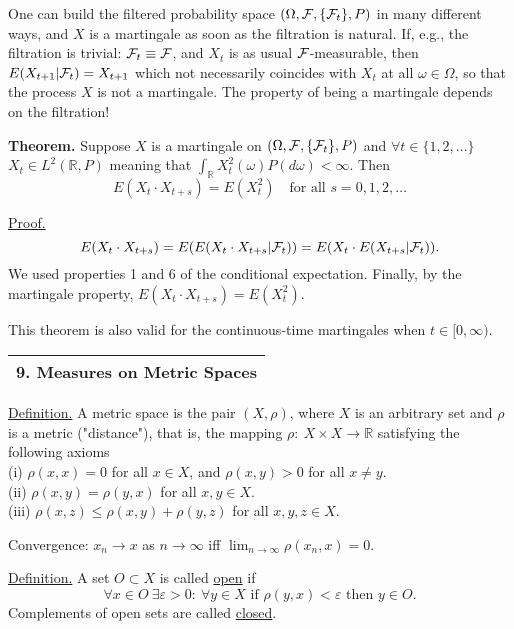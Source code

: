 \documentclass[a4paper,10pt]{article}
\def\RR{\mathbb{R}}
\newcommand{\1}[1]{\mathbf{1}_{\{#1\}}}
\begin{document}
One can build the filtered probability space $(\Omega,{\cal F},\{{\cal F}_t\},P)$ in many different ways, and $X$ is a martingale as soon as the filtration is natural. If, e.g., the filtration is trivial: ${\cal F}_t\equiv{\cal F}$, and $X_t$ is as usual $\cal F$-measurable, then  $E(X_{t+1}|{\cal F}_t)=X_{t+1}$ which not necessarily coincides with $X_t$ at all $\omega\in\Omega$, so that  the process $X$ is not a martingale. The property of being a martingale depends on the filtration!

{\bf Theorem.} Suppose $X$ is a martingale on $(\Omega,{\cal F},\{{\cal F}_t\},P)$ and $\forall t\in\{1,2,\ldots\}$ $X_t\in L^2(\RR,P)$ meaning that $\int_\RR X_t^2(\omega)P(d\omega)<\infty$. Then
$$E(X_t\cdot X_{t+s})=E(X_t^2)~~~\mbox{ for all } s=0,1,2,\ldots$$

\underline{Proof.}
$$E(X_t\cdot X_{t+s})=E(E(X_t\cdot X_{t+s}|{\cal F}_t))=E(X_t\cdot E(X_{t+s}|{\cal F}_t)).$$
We used properties 1 and 6 of the conditional expectation. Finally, by the martingale property, $E(X_t\cdot X_{t+s})=E(X^2_t)$.\hfill \blacksquare

This theorem is also valid for the continuous-time martingales when $t\in[0,\infty)$.\vspace{5mm}

\begin{tabular}{|l|}
\hline {\LARGE\bf 9. Measures on Metric Spaces}\\
\hline\end{tabular}
\vspace{5mm}

\underline{Definition.} A metric space is the pair $(X,\rho)$, where $X$ is an arbitrary set and $\rho$ is a metric ("distance"), that is, the mapping $\rho:~X\times X\to\RR$ satisfying the following axioms\\
(i) $\rho(x,x)=0$ for all $x\in X$, and $\rho(x,y)>0$ for all $x\ne y$. \\
(ii) $\rho(x,y)=\rho(y,x)$ for all $x,y\in X$.\\
(iii) $\rho(x,z)\le \rho(x,y)+\rho(y,z)$ for all $x,y,z\in X$.\vspace{3mm}

Convergence: $x_n\to x$ as $n\to\infty$ iff $\lim_{n\to\infty} \rho(x_n,x)=0$.\vspace{2mm}

\underline{Definition.} A set $O\subset X$ is called \underline{open} if
$$\forall x\in O~\exists \varepsilon>0:~\forall y\in X \mbox{ if } \rho(y,x)<\varepsilon \mbox{ then } y\in O.$$
Complements of open sets are called \underline{closed}.
\end{document}
